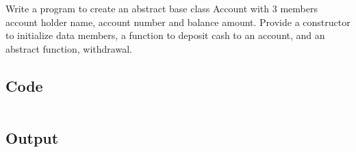 \documentclass[../main.tex]{subfiles}
\begin{document}
Write a program to create an abstract base class Account with 3 members
account holder name, account number and balance amount. Provide a constructor
to initialize data members, a function to deposit cash to an account, and an
abstract function, withdrawal.

\subsection{Code}
\inputminted[frame=lines, breaklines, breakanywhere, numberblanklines=false]{java}{./programs/prog7/Account.java}

\subsection{Output}
\end{document}
